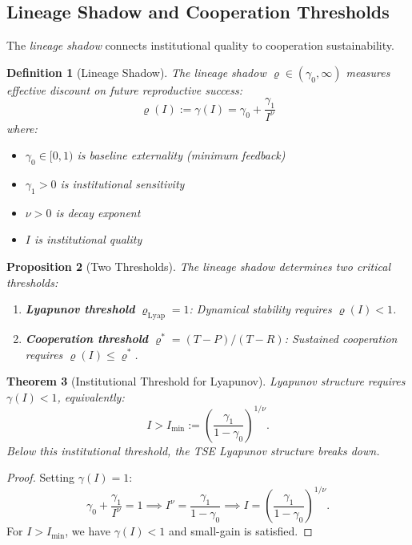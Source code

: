 \documentclass[12pt]{article}
\newtheorem{theorem}{Theorem}[section]
\newtheorem{proposition}[theorem]{Proposition}
\newtheorem{definition}[theorem]{Definition}
\begin{document}
\subsection{Lineage Shadow and Cooperation Thresholds}

The \emph{lineage shadow} connects institutional quality to cooperation sustainability.

\begin{definition}[Lineage Shadow]
The \emph{lineage shadow} $\varrho \in (\gamma_0, \infty)$ measures effective discount on future reproductive success:
\[
\varrho(I) := \gamma(I) = \gamma_0 + \frac{\gamma_1}{I^\nu}
\]
where:
\begin{itemize}
    \item $\gamma_0 \in [0, 1)$ is baseline externality (minimum feedback)
    \item $\gamma_1 > 0$ is institutional sensitivity
    \item $\nu > 0$ is decay exponent
    \item $I$ is institutional quality
\end{itemize}
\end{definition}

\begin{proposition}[Two Thresholds]
\label{prop:two-thresholds}
The lineage shadow determines two critical thresholds:
\begin{enumerate}
    \item \textbf{Lyapunov threshold} $\varrho_{\mathrm{Lyap}} = 1$: Dynamical stability requires $\varrho(I) < 1$.
    \item \textbf{Cooperation threshold} $\varrho^* = (T - P)/(T - R)$: Sustained cooperation requires $\varrho(I) \leq \varrho^*$.
\end{enumerate}
\end{proposition}

\begin{theorem}[Institutional Threshold for Lyapunov]
\label{thm:institutional-threshold}
Lyapunov structure requires $\gamma(I) < 1$, equivalently:
\[
I > I_{\min} := \left( \frac{\gamma_1}{1 - \gamma_0} \right)^{1/\nu}.
\]
Below this institutional threshold, the TSE Lyapunov structure breaks down.
\end{theorem}

\begin{proof}
Setting $\gamma(I) = 1$:
\[
\gamma_0 + \frac{\gamma_1}{I^\nu} = 1 \implies I^\nu = \frac{\gamma_1}{1 - \gamma_0} \implies I = \left( \frac{\gamma_1}{1 - \gamma_0} \right)^{1/\nu}.
\]
For $I > I_{\min}$, we have $\gamma(I) < 1$ and small-gain is satisfied.
\end{proof}
\end{document}
